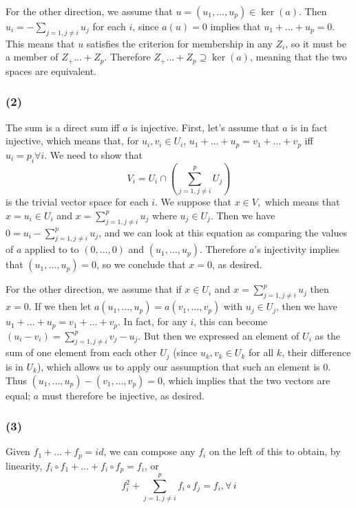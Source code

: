 \documentclass{article}
\begin{document}
For the other direction, we assume that $u = (u_1,\dots,u_p) \in \ker(a)$.
Then $u_i = -\sum_{j = 1, j \neq i} u_j$ for each $i$, since $a(u) = 0$ implies
that $u_1 + \dots + u_p = 0$.
This means that $u$ satisfies the criterion for membership in any $Z_i$, so it
must be a member of $Z_ + \dots + Z_p$.
Therefore $Z_ + \dots + Z_p \supseteq \ker(a)$, meaning that the two spaces are
equivalent.

\subsubsection{(2)}
The sum is a direct sum iff $a$ is injective.
First, let's assume that $a$ is in fact injective, which means that, for
$u_i,v_i \in U_i$,
$u_1 + \dots + u_p = v_1 + \dots + v_p$ iff $u_i = p_i \forall i$.
We need to show that
\[V_i = U_i \cap \left( \sum_{j=1,j\neq i}^p U_j \right)\]
is the trivial vector space for each $i$. We suppose that $x \in V,$ which means that
$x = u_i \in U_i$ and $x = \displaystyle{\sum_{j=1,j \neq i}^p} u_j$ where
$u_j \in U_j$.
Then we have $0 = u_i - \displaystyle{\sum_{j=1,j \neq i}^p} u_j$, and we can
look at this equation as comparing the values of $a$ applied to to $(0,\dots,0)$
and $(u_1,\dots,u_p)$. Therefore $a$'s injectivity implies that $(u_1,\dots,u_p)
= 0$, so we conclude that $x = 0$, as desired.

\medskip
For the other direction, we assume that if $x \in U_i$ and $x =
\displaystyle{\sum_{j=1,j \neq i}^p} u_j$ then $x = 0$.
If we then let $a(u_1,\dots,u_p) = a(v_1,\dots,v_p)$ with $u_j \in U_j$, then we
have $u_1 + \dots + u_p = v_1 + \dots + v_p$. In fact, for any $i$, this can
become $(u_i - v_i) = \displaystyle{\sum_{j=1,j \neq i}^p} v_j - u_j$. But then
we expressed an element of $U_i$ as the sum of one element from each other $U_j$
(since $u_k, v_k \in U_k$ for all $k$, their difference is in $U_k$), which
allows us to apply our assumption that such an element is 0.
Thus $(u_1,\dots,u_p) - (v_1,\dots,v_p) = 0$, which implies that the two vectors
are equal; $a$ must therefore be injective, as desired.

\subsubsection{(3)}
Given $f_1 + \dots + f_p = id$, we can compose any $f_i$ on the left of this to
obtain, by linearity, $f_i \circ f_1 + \dots + f_i \circ f_p = f_i$, or
\[f_i^2 + \sum_{j=1,j \neq i}^p f_i \circ f_j = f_i, \forall\, i\]
\end{document}

